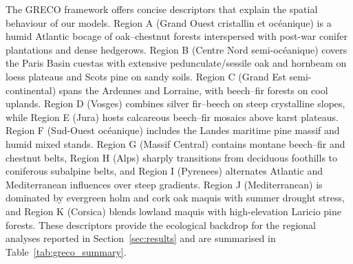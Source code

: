 \documentclass[utf8]{FrontiersinHarvard}
\begin{document}
The GRECO framework offers concise descriptors that explain the spatial behaviour of our models. Region A (Grand Ouest cristallin et océanique) is a humid Atlantic bocage of oak–chestnut forests interspersed with post-war conifer plantations and dense hedgerows. Region B (Centre Nord semi-océanique) covers the Paris Basin cuestas with extensive pedunculate/sessile oak and hornbeam on loess plateaus and Scots pine on sandy soils. Region C (Grand Est semi-continental) spans the Ardennes and Lorraine, with beech–fir forests on cool uplands. Region D (Vosges) combines silver fir–beech on steep crystalline slopes, while Region E (Jura) hosts calcareous beech–fir mosaics above karst plateaus. Region F (Sud-Ouest océanique) includes the Landes maritime pine massif and humid mixed stands. Region G (Massif Central) contains montane beech–fir and chestnut belts, Region H (Alps) sharply transitions from deciduous foothills to coniferous subalpine belts, and Region I (Pyrenees) alternates Atlantic and Mediterranean influences over steep gradients. Region J (Mediterranean) is dominated by evergreen holm and cork oak maquis with summer drought stress, and Region K (Corsica) blends lowland maquis with high-elevation Laricio pine forests. These descriptors provide the ecological backdrop for the regional analyses reported in Section~\ref{sec:results} and are summarised in Table~\ref{tab:greco_summary}.
\end{document}
